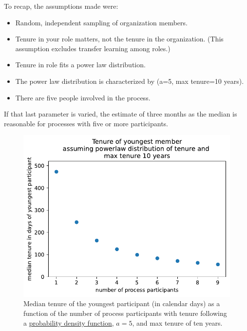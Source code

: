 \begin{samepage}
To recap, the assumptions made were:
\begin{itemize}
    \item Random, independent sampling of organization members. 
    \item Tenure in your role matters, not the tenure in the organization. (This assumption excludes transfer learning among roles.)
    \item Tenure in role fits a power law distribution.
    \item The power law distribution is characterized by (a=5, max tenure=10 years). 
    \item There are five people involved in the process.
\end{itemize}
\end{samepage}
If that last parameter is varied, the estimate of three months as the median  is reasonable for processes with five or more participants.

\begin{figure}[!htb]  %
    \centering %
    \includegraphics[width=1\textwidth]{images/tenure_power_distribution_a5_with_max_tenure10.pdf}
    \caption{Median tenure of the youngest participant (in calendar days) as a function of the number of process participants with tenure following a 
    \href{https://en.wikipedia.org/wiki/Probability_density_function}{probability density function},
    $a=5$, and max tenure of ten years.}
    \label{fig:tenure-powerlaw-5-participants}
\end{figure}


